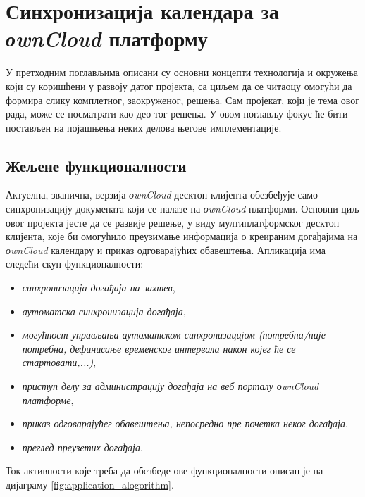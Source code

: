 \chapter{Синхронизација календара за \textit{оwnCloud} платформу}
\label{chap:ownCloudCalendarSynchronization}

У претходним поглављима описани су основни концепти технологија и окружења који су коришћени у развоју датог пројекта, са циљем да се читаоцу омогући да формира слику комплетног, заокруженог, решења. Сам пројекат, који је тема овог рада, може се посматрати као део тог решења. У овом поглављу фокус ће бити постављен на појашњења неких делова његове имплементације.

\section{Жељене функционалности}

Актуелна, званична, верзија \textit{оwnCloud} десктоп клијента обезбеђује само синхронизацију докумената који се налазе на \textit{оwnCloud} платформи. Основни циљ овог пројекта јесте да се развије решење, у виду мултиплатформског десктоп клијента, које би омогућило преузимање информација о креираним догађајима на \textit{оwnCloud} календару и приказ одговарајућих обавештења. Апликација има следећи скуп функционалности:
\begin{itemize}
	\item{\textit{синхронизација догађаја на захтев}},
	\item{\textit{аутоматска синхронизација догађаја}},
	\item{\textit{могућност управљања аутоматском синхронизацијом (потребна/није потребна, дефинисање временског интервала након којег ће се стартовати,...)}},
	\item{\textit{приступ делу за администрацију догађаја на веб порталу \textit{оwnCloud} платформе}},
	\item{\textit{приказ одговарајућег обавештења, непосредно пре почетка неког догађаја}},
	\item{\textit{преглед преузетих догађаја}}.
\end{itemize}

Ток активности које треба да обезбеде ове функционалности описан је на дијаграму \ref{fig:application_alogorithm}.

